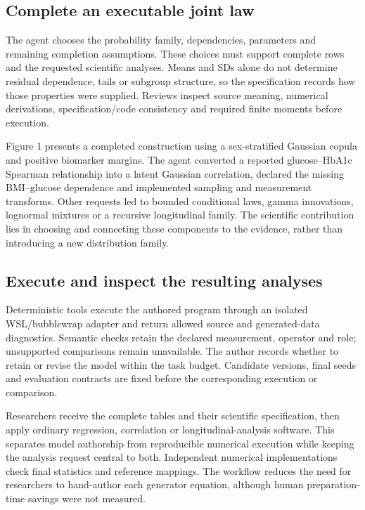 \documentclass[sigconf,anonymous,review]{acmart}
\begin{document}
\subsection{Complete an executable joint law}

The agent chooses the probability family, dependencies, parameters and remaining completion assumptions. These choices must support complete rows and the requested scientific analyses. Means and SDs alone do not determine residual dependence, tails or subgroup structure, so the specification records how those properties were supplied. Reviews inspect source meaning, numerical derivations, specification/\allowbreak{}code consistency and required finite moments before execution.


Figure 1 presents a completed construction using a sex-stratified Gaussian copula and positive biomarker margins. The agent converted a reported glucose–\allowbreak{}HbA1c Spearman relationship into a latent Gaussian correlation, declared the missing BMI–\allowbreak{}glucose dependence and implemented sampling and measurement transforms. Other requests led to bounded conditional laws, gamma innovations, lognormal mixtures or a recursive longitudinal family. The scientific contribution lies in choosing and connecting these components to the evidence, rather than introducing a new distribution family.


\subsection{Execute and inspect the resulting analyses}

Deterministic tools execute the authored program through an isolated WSL/\allowbreak{}bubblewrap adapter and return allowed source and generated-data diagnostics. Semantic checks retain the declared measurement, operator and role; unsupported comparisons remain unavailable. The author records whether to retain or revise the model within the task budget. Candidate versions, final seeds and evaluation contracts are fixed before the corresponding execution or comparison.


Researchers receive the complete tables and their scientific specification, then apply ordinary regression, correlation or longitudinal-analysis software. This separates model authorship from reproducible numerical execution while keeping the analysis request central to both. Independent numerical implementations check final statistics and reference mappings. The workflow reduces the need for researchers to hand-author each generator equation, although human preparation-time savings were not measured.
\end{document}
